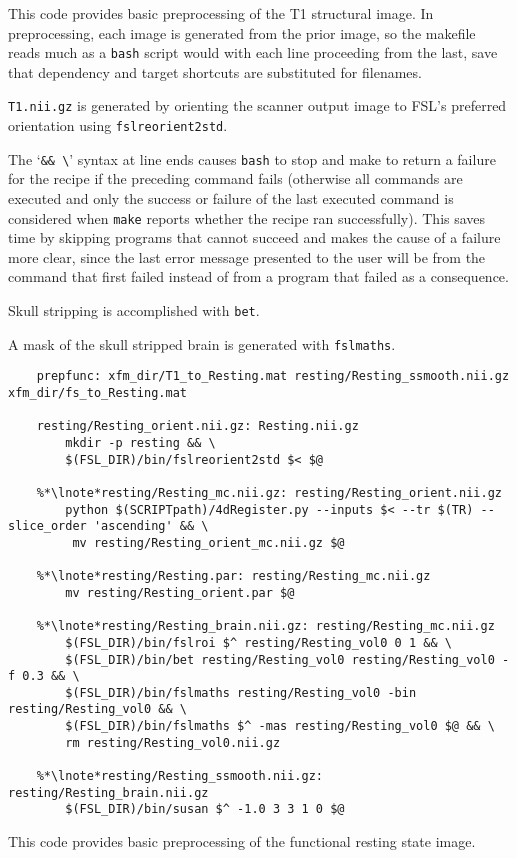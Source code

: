 This code provides basic preprocessing of the T1 structural image. In preprocessing, each image is generated from the prior image, so the makefile reads much as a \texttt{bash} script would with each line proceeding from the last, save that dependency and target shortcuts are substituted for filenames.

\texttt{T1.nii.gz} is generated by orienting the scanner output image to FSL's preferred orientation using \texttt{fslreorient2std}.

The `\texttt{\&\& \textbackslash}' syntax at line ends causes \texttt{bash} to stop and make to return a failure for the recipe if the preceding command fails (otherwise all commands are executed and only the success or failure of the last executed command is considered when \texttt{make} reports whether the recipe ran successfully). This saves time by skipping programs that cannot succeed and makes the cause of a failure more clear, since the last error message presented to the user will be from the command that first failed instead of from a program that failed as a consequence.

Skull stripping is accomplished with \texttt{bet}.

A mask of the skull stripped brain is generated with \texttt{fslmaths}.

\begin{lstlisting}
	prepfunc: xfm_dir/T1_to_Resting.mat resting/Resting_ssmooth.nii.gz xfm_dir/fs_to_Resting.mat
	
	resting/Resting_orient.nii.gz: Resting.nii.gz
		mkdir -p resting && \
		$(FSL_DIR)/bin/fslreorient2std $< $@

	%*\lnote*resting/Resting_mc.nii.gz: resting/Resting_orient.nii.gz
		python $(SCRIPTpath)/4dRegister.py --inputs $< --tr $(TR) --slice_order 'ascending' && \
		 mv resting/Resting_orient_mc.nii.gz $@
	
	%*\lnote*resting/Resting.par: resting/Resting_mc.nii.gz
		mv resting/Resting_orient.par $@

	%*\lnote*resting/Resting_brain.nii.gz: resting/Resting_mc.nii.gz
		$(FSL_DIR)/bin/fslroi $^ resting/Resting_vol0 0 1 && \
		$(FSL_DIR)/bin/bet resting/Resting_vol0 resting/Resting_vol0 -f 0.3 && \
		$(FSL_DIR)/bin/fslmaths resting/Resting_vol0 -bin resting/Resting_vol0 && \
		$(FSL_DIR)/bin/fslmaths $^ -mas resting/Resting_vol0 $@ && \
		rm resting/Resting_vol0.nii.gz

	%*\lnote*resting/Resting_ssmooth.nii.gz: resting/Resting_brain.nii.gz
		$(FSL_DIR)/bin/susan $^ -1.0 3 3 1 0 $@	
\end{lstlisting}
This code provides basic preprocessing of the functional resting state image.

